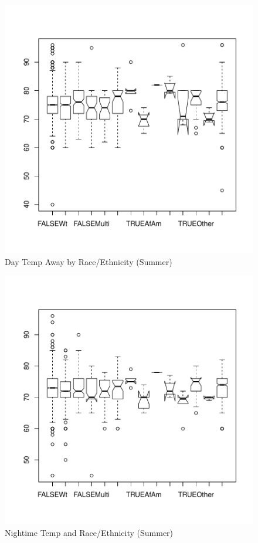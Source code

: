 \documentclass{article}
\begin{document}
\begin{figure}
\begin{center}
\caption{Day Temp Away by Race/Ethnicity (Summer)}
\label{fig:NightRaceS}
\includegraphics{DraftEdwardsWoods-019}
\end{center}
\end{figure}


\begin{figure}
\begin{center}
\caption{Nightime Temp and Race/Ethnicity (Summer)}
\label{fig:NightRaceS}
\includegraphics{DraftEdwardsWoods-020}
\end{center}
\end{figure}
  
\end{document}
